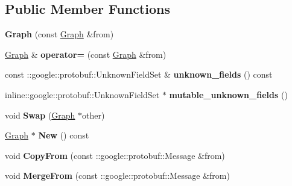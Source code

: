 \subsection*{Public Member Functions}
\begin{DoxyCompactItemize}
\item 
\hypertarget{classgraph_1_1Graph_a400fcc675124ef60cbc0d6ee0e25736c}{
{\bfseries Graph} (const \hyperlink{classgraph_1_1Graph}{Graph} \&from)}
\label{classgraph_1_1Graph_a400fcc675124ef60cbc0d6ee0e25736c}

\item 
\hypertarget{classgraph_1_1Graph_a2bb8b8cdf8632d9a9453b3f67d0eef9c}{
\hyperlink{classgraph_1_1Graph}{Graph} \& {\bfseries operator=} (const \hyperlink{classgraph_1_1Graph}{Graph} \&from)}
\label{classgraph_1_1Graph_a2bb8b8cdf8632d9a9453b3f67d0eef9c}

\item 
\hypertarget{classgraph_1_1Graph_a4944a9b85ffdbecf91ec2454f915b411}{
const ::google::protobuf::UnknownFieldSet \& {\bfseries unknown\_\-fields} () const }
\label{classgraph_1_1Graph_a4944a9b85ffdbecf91ec2454f915b411}

\item 
\hypertarget{classgraph_1_1Graph_a93081ad4e0af2767c6f57004f5f59dc2}{
inline::google::protobuf::UnknownFieldSet $\ast$ {\bfseries mutable\_\-unknown\_\-fields} ()}
\label{classgraph_1_1Graph_a93081ad4e0af2767c6f57004f5f59dc2}

\item 
\hypertarget{classgraph_1_1Graph_a8e3853558c7080802e9362e869206156}{
void {\bfseries Swap} (\hyperlink{classgraph_1_1Graph}{Graph} $\ast$other)}
\label{classgraph_1_1Graph_a8e3853558c7080802e9362e869206156}

\item 
\hypertarget{classgraph_1_1Graph_acd6092ae47d8f7108ececea2c47bdd06}{
\hyperlink{classgraph_1_1Graph}{Graph} $\ast$ {\bfseries New} () const }
\label{classgraph_1_1Graph_acd6092ae47d8f7108ececea2c47bdd06}

\item 
\hypertarget{classgraph_1_1Graph_ad8df9792d5748b48235e04e64abf84fd}{
void {\bfseries CopyFrom} (const ::google::protobuf::Message \&from)}
\label{classgraph_1_1Graph_ad8df9792d5748b48235e04e64abf84fd}

\item 
\hypertarget{classgraph_1_1Graph_ab52f15c185ebf734246297add1064b4a}{
void {\bfseries MergeFrom} (const ::google::protobuf::Message \&from)}
\label{classgraph_1_1Graph_ab52f15c185ebf734246297add1064b4a}


\end{DoxyCompactItemize}
